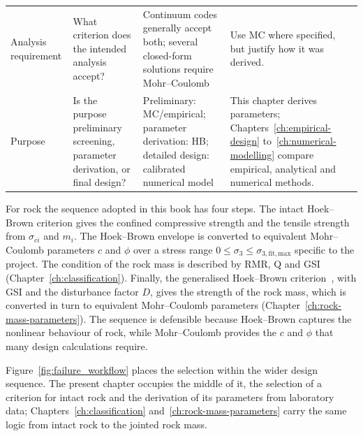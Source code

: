 \begin{table}[htbp]
\begin{tabularx}{\textwidth}{l Y Y Y}
Analysis requirement
& What criterion does the intended analysis accept?
& Continuum codes generally accept both; several closed-form solutions require Mohr--Coulomb
& Use MC where specified, but justify how it was derived. \\

Purpose
& Is the purpose preliminary screening, parameter derivation, or final design?
& Preliminary: MC/empirical; parameter derivation: HB; detailed design: calibrated numerical model
& This chapter derives parameters; Chapters~\ref{ch:empirical-design} to~\ref{ch:numerical-modelling} compare empirical, analytical and numerical methods. \\
\bottomrule
\end{tabularx}
\end{table}

For rock the sequence adopted in this book has four steps. The intact
Hoek--Brown criterion gives the confined compressive strength and the tensile
strength from \(\sigma_{ci}\) and \(m_i\). The Hoek--Brown envelope is
converted to equivalent Mohr--Coulomb parameters \(c\) and \(\phi\) over a
stress range \(0 \leq \sigma_3 \leq \sigma_{3,\mathrm{fit,max}}\) specific to
the project. The condition of the rock mass is described by RMR, Q and GSI
(Chapter~\ref{ch:classification}). Finally, the generalised Hoek--Brown
criterion~\citep{hoek2019hb}, with GSI and the disturbance factor \(D\), gives
the strength of the rock mass, which is converted in turn to equivalent
Mohr--Coulomb parameters (Chapter~\ref{ch:rock-mass-parameters}). The sequence
is defensible because Hoek--Brown captures the nonlinear behaviour of rock,
while Mohr--Coulomb provides the \(c\) and \(\phi\) that many design
calculations require.

Figure~\ref{fig:failure_workflow} places the selection within the wider
design sequence. The present chapter occupies the middle of it, the selection
of a criterion for intact rock and the derivation of its parameters from
laboratory data; Chapters~\ref{ch:classification}
and~\ref{ch:rock-mass-parameters} carry the same logic from intact rock to the
jointed rock mass.

